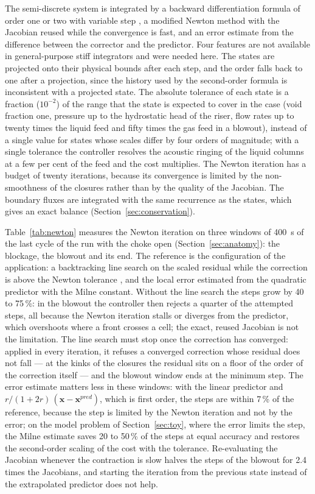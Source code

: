 \documentclass[a4paper,fleqn]{cas-sc}
\newcommand{\bx}{\mathbf{x}}
\begin{document}
The semi-discrete system is integrated by a backward differentiation formula of order one or two with variable step \citep{hairer1996}, a modified Newton method with the Jacobian reused while the convergence is fast, and an error estimate from the difference between the corrector and the predictor. Four features are not available in general-purpose stiff integrators and were needed here. The states are projected onto their physical bounds after each step, and the order falls back to one after a projection, since the history used by the second-order formula is inconsistent with a projected state. The absolute tolerance of each state is a fraction ($10^{-2}$) of the range that the state is expected to cover in the case (void fraction one, pressure up to the hydrostatic head of the riser, flow rates up to twenty times the liquid feed and fifty times the gas feed in a blowout), instead of a single value for states whose scales differ by four orders of magnitude; with a single tolerance the controller resolves the acoustic ringing of the liquid columns at a few per cent of the feed and the cost multiplies. The Newton iteration has a budget of twenty iterations, because its convergence is limited by the non-smoothness of the closures rather than by the quality of the Jacobian. The boundary fluxes are integrated with the same recurrence as the states, which gives an exact balance (Section~\ref{sec:conservation}).

Table~\ref{tab:newton} measures the Newton iteration on three windows of \SI{400}{\second} of the last cycle of the run with the choke open (Section~\ref{sec:anatomy}): the blockage, the blowout and its end. The reference is the configuration of the application: a backtracking line search on the scaled residual while the correction is above the Newton tolerance \citep{dennis1996}, and the local error estimated from the quadratic predictor with the Milne constant. Without the line search the steps grow by 40 to 75\,\%: in the blowout the controller then rejects a quarter of the attempted steps, all because the Newton iteration stalls or diverges from the predictor, which overshoots where a front crosses a cell; the exact, reused Jacobian is not the limitation. The line search must stop once the correction has converged: applied in every iteration, it refuses a converged correction whose residual does not fall --- at the kinks of the closures the residual sits on a floor of the order of the correction itself --- and the blowout window ends at the minimum step. The error estimate matters less in these windows: with the linear predictor and $r/(1+2r)\,(\bx - \bx^{pred})$, which is first order, the steps are within 7\,\% of the reference, because the step is limited by the Newton iteration and not by the error; on the model problem of Section~\ref{sec:toy}, where the error limits the step, the Milne estimate saves 20 to 50\,\% of the steps at equal accuracy and restores the second-order scaling of the cost with the tolerance. Re-evaluating the Jacobian whenever the contraction is slow halves the steps of the blowout for 2.4 times the Jacobians, and starting the iteration from the previous state instead of the extrapolated predictor does not help.
\end{document}
